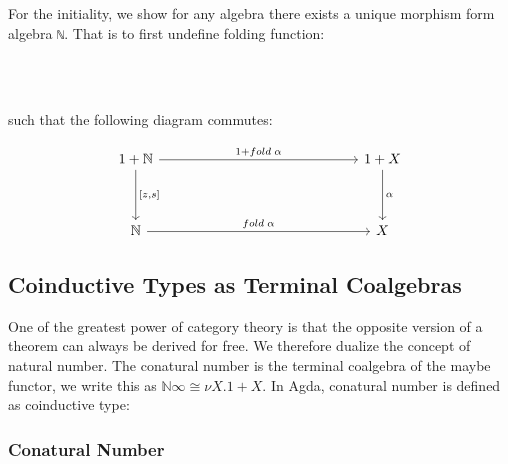 {For the initiality, we show for any algebra there exists a unique morphism form algebra \texttt{ℕ}. That is to first undefine folding function:

\begin{code}%
\>[0]\AgdaSpace{}%
\AgdaSymbol{:}\AgdaSpace{}%
\AgdaSymbol{(}\AgdaSpace{}%
\AgdaSpace{}%
\AgdaSpace{}%
\AgdaSpace{}%
\AgdaSymbol{)}\AgdaSpace{}%
\AgdaSpace{}%
\AgdaSpace{}%
\AgdaSpace{}%
\<%
\\
\>[0]\AgdaSpace{}%
\AgdaSpace{}%
\AgdaSpace{}%
\AgdaSymbol{=}\AgdaSpace{}%
\AgdaSpace{}%
\AgdaSymbol{(}\AgdaSpace{}%
\AgdaSymbol{)}\<%
\\
\>[0]\AgdaSpace{}%
\AgdaSpace{}%
\AgdaSymbol{(}\AgdaSpace{}%
\AgdaSymbol{)}\AgdaSpace{}%
\AgdaSymbol{=}\AgdaSpace{}%
\AgdaSpace{}%
\AgdaSymbol{(}\AgdaSpace{}%
\AgdaSymbol{(}\AgdaSpace{}%
\AgdaSpace{}%
\AgdaSymbol{))}\<%
\end{code}

such that the following diagram commutes:

\[
\begin{tikzcd}[row sep=huge, column sep=5cm]
1 + \mathbb{N} \arrow[r, "1 + fold\;\alpha"] \arrow[d, "{[z,s]}"]
& 1 + X \arrow[d, "\alpha"] \\
\mathbb{N} \arrow[r, "fold\;\alpha"]
& X
\end{tikzcd}
\]


\subsection{Coinductive Types as Terminal Coalgebras}

One of the greatest power of category theory is that the opposite version of a theorem can always be derived for free. We therefore dualize the concept of natural number. The conatural number is the terminal coalgebra of the maybe functor, we write this as $\mathbb{N}\infty \cong \nu X. 1 + X$. In Agda, conatural number is defined as coinductive type:

\subsubsection*{Conatural Number}

}
